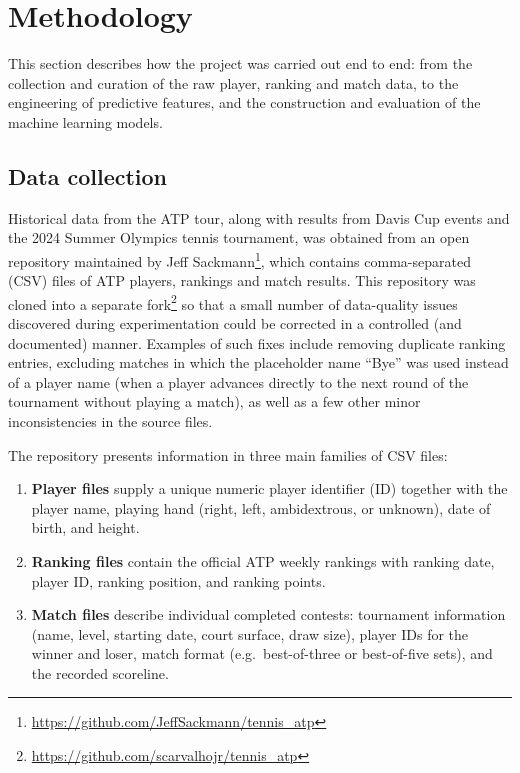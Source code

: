 

\pagebreak


\section{Methodology}
\label{sec:methodology}

This section describes how the project was carried out end to end: from the collection and curation
of the raw player, ranking and match data, to the engineering of predictive features, and the
construction
and evaluation of the machine learning models.

\subsection{Data collection}

Historical data from the ATP tour, along with results from Davis Cup events and the 2024 Summer
Olympics tennis tournament, was obtained from an open repository maintained by Jeff
Sackmann\footnote{\url{https://github.com/JeffSackmann/tennis_atp}}, which contains comma-separated
(CSV) files of ATP players, rankings and match results. This repository was cloned into a separate
fork\footnote{\url{https://github.com/scarvalhojr/tennis_atp}} so that a small number of
data-quality issues discovered during experimentation could be corrected in a controlled (and
documented) manner. Examples of such fixes include removing duplicate ranking entries, excluding
matches in which the placeholder name ``Bye'' was used instead of a player name (when a player
advances directly to the next round of the tournament without playing a match), as well as a few other
minor inconsistencies in the source files.

The repository presents information in three main families of CSV files:
\begin{enumerate}[label=(\arabic*)]
  \item \textbf{Player files} supply a unique numeric player identifier (ID) together with the
    player name, playing hand (right, left, ambidextrous, or unknown), date of birth, and height.
  \item \textbf{Ranking files} contain the official ATP weekly rankings with ranking date, player
    ID, ranking position, and ranking points.
  \item \textbf{Match files} describe individual completed contests: tournament information (name,
    level, starting date, court surface, draw size), player IDs for the winner and loser, match
    format (e.g.\ best-of-three or best-of-five sets), and the recorded scoreline.
\end{enumerate}

